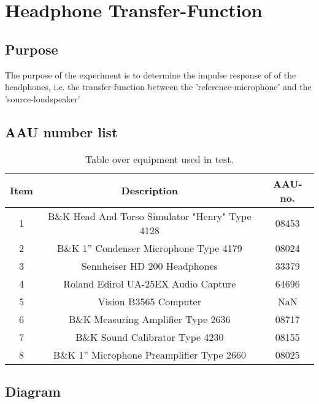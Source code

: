 \section{Headphone Transfer-Function} \label{sec:HPjournal}
\subsection{Purpose}
The purpose of the experiment is to determine the impulse response of of the  headphones, i.e. the transfer-function between the 'reference-microphone' and the 'source-loudspeaker'

\subsection{AAU number list}
\begin{table}[H]
	\centering
	\begin{tabular}{ c c c } \toprule
		{Item}	& {Description} 						& {AAU-no}. \\ \bottomrule 
		1	&	B\&K Head And Torso Simulator "Henry" Type 4128	& 08453		\\
		2	&	B\&K 1'' Condenser Microphone Type 4179 & 08024\\
		3	&	Sennheiser HD 200	Headphones			& 33379		\\
		4	&	Roland Edirol UA-25EX Audio Capture		& 64696		\\
		5	&	Vision B3565 Computer					& NaN		\\
		6	&	B\&K Measuring Amplifier Type 2636	& 08717		\\
		7	&	B\&K Sound Calibrator Type 4230			& 08155		\\ 
		8	&	B\&K 1'' Microphone Preamplifier Type 2660	& 08025		\\
		\bottomrule
	\end{tabular}
	\caption{Table over equipment used in test.}
	\label{tab:UsedEquipmentListningHP}
\end{table}

\subsection{Diagram}


